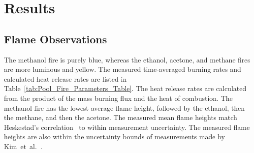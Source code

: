 \documentclass[preprint,review,12pt]{elsarticle}
\begin{document}
\section{Results}
\label{sec:Results}

\subsection{Flame Observations}
\label{ssec:Flame_Observations}
The methanol fire is purely blue, whereas the ethanol, acetone, and methane fires are more luminous and yellow. The measured time-averaged burning rates and calculated heat release rates are listed in Table~\ref{tab:Pool_Fire_Parameters_Table}. The heat release rates are calculated from the product of the mass burning flux and the heat of combustion. The methanol fire has the lowest average flame height, followed by the ethanol, then the methane, and then the acetone. The measured mean flame heights match Heskestad’s correlation~\cite{Heskestad1983} to within measurement uncertainty. The measured flame heights are also within the uncertainty bounds of measurements made by Kim~et~al.~\cite{Kim2019}.

\begin{table}[!t]
\caption[List of measurements and thermochemical properties of fuels]{List of measurements and thermochemical properties of fuels burning in a well-ventilated round pool fire}
\label{tab:Pool_Fire_Parameters_Table}
\footnotesize
{}
\end{table}
\end{document}

